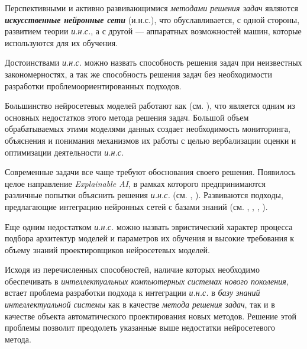 Перспективными и активно развивающимися \textit{методами решения задач} являются \textbf{\textit{искусственные нейронные сети}} (и.н.с.), что обуславливается, с одной стороны, развитием теории \textit{и.н.с.}, а с другой --- аппаратных возможностей машин, которые используются для их обучения.

Достоинствами \textit{и.н.с.} можно назвать способность решения задач при неизвестных закономерностях, а так же способность решения задач без необходимости разработки проблемоориентированных подходов.

Большинство нейросетевых моделей работают как  (см. ), что является одним из основных недостатков этого метода решения задач. Большой объем обрабатываемых этими моделями данных создает необходимость мониторинга, объяснения и понимания механизмов их работы с целью вербализации оценки и оптимизации деятельности \textit{и.н.с.}

Современные задачи все чаще требуют обоснования своего решения. Появилось целое направление \textit{Explainable AI}, в рамках которого предпринимаются различные попытки объяснить решения \textit{и.н.с.} (см. , ). Развиваются подходы, предлагающие интеграцию нейронных сетей с базами знаний (см. , , , ).

Еще одним недостатком \textit{и.н.с.} можно назвать эвристический характер процесса подбора архитектур моделей и параметров их обучения и высокие требования к объему знаний проектировщиков нейросетевых моделей.

Исходя из перечисленных способностей, наличие которых необходимо обеспечивать в \textit{интеллектуальных компьютерных системах нового поколения}, встает проблема разработки подхода к интеграции \textit{и.н.с.} в \textit{базу знаний} \textit{интеллектуальной системы} как в качестве \textit{метода решения задач}, так и в качестве объекта автоматического проектирования новых методов. Решение этой проблемы позволит преодолеть указанные выше недостатки нейросетевого метода.

